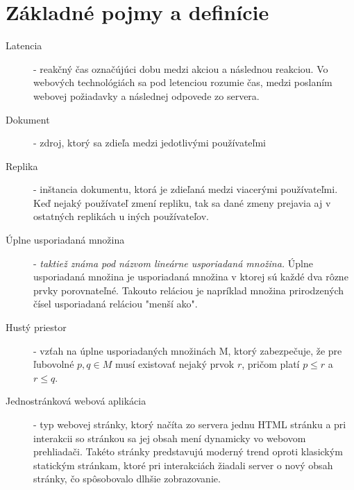\chapter{Základné pojmy a definície}

\label{kap:zakladne} %

\begin{description}
\item [Latencia] - reakčný čas označújúci dobu medzi akciou a následnou reakciou. Vo webových 
technológiách sa pod letenciou rozumie čas, medzi poslaním webovej požiadavky a následnej
odpovede zo servera.
\item [Dokument] - zdroj, ktorý sa zdieľa medzi jedotlivými používateľmi
\item [Replika] - inštancia dokumentu, ktorá je zdieľaná medzi viacerými používateľmi. Keď nejaký
používateľ zmení repliku, tak sa dané zmeny prejavia aj v ostatných replikách u iných
používateľov.
\item [Úplne usporiadaná množina] - \textit{taktiež známa pod názvom lineárne usporiadaná množina.} 
Úplne usporiadaná množina je usporiadaná množina v ktorej sú každé dva rôzne prvky porovnateľné. 
Takouto reláciou je napríklad množina prirodzených čísel usporiadaná reláciou "menší ako".
\item [Hustý priestor] - vzťah na úplne usporiadaných množinách M, ktorý zabezpečuje, že pre 
ľubovolné $p, q \in M$ musí existovať nejaký prvok $r$, pričom platí $p \leq r$ a 
$r \leq q$.
\item [Jednostránková webová aplikácia] - typ webovej stránky, ktorý načíta zo servera jednu HTML
stránku a pri interakcii so stránkou sa jej obsah mení dynamicky vo webovom prehliadači. Takéto
stránky predstavujú moderný trend oproti klasickým statickým stránkam, ktoré pri interakciách
žiadali server o nový obsah stránky, čo spôsobovalo dlhšie zobrazovanie.
\end{description}
